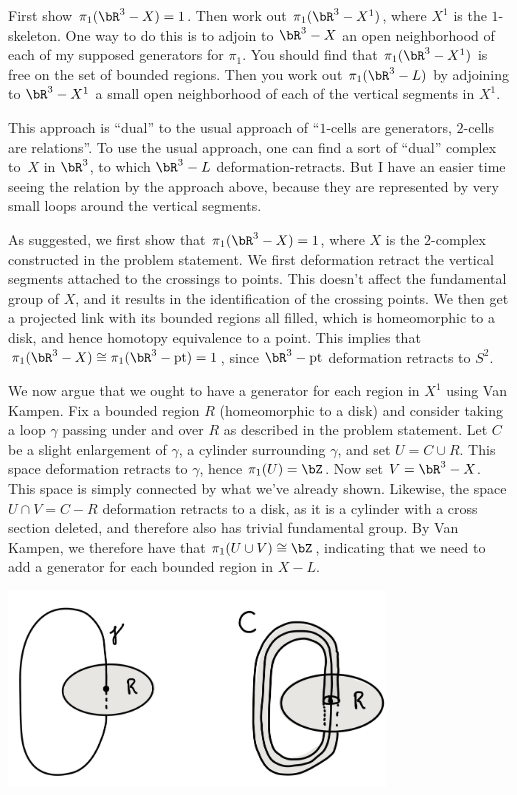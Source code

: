 \begin{homework}[e]
    First show  $\pi_1(\bR^3-X)=1$.  
    Then work out $\pi_1(\bR^3-X^1)$, where $X^1$ is
    the $1$-skeleton.  One way to do this is to  adjoin to $\bR^3-X$ an open
    neighborhood of each of my supposed  generators for $\pi_1$. 
    You should find that $\pi_1(\bR^3-X^1)$ is free on the set of bounded regions. 
    Then you work out $\pi_1(\bR^3-L)$ by adjoining to $\bR^3-X^1$ a small open
    neighborhood of each of the vertical segments in $X^1$. 
    
    This approach is ``dual'' to the usual approach of ``$1$-cells are generators,
    $2$-cells are relations''.  To use the usual approach, one can find a sort
    of ``dual'' complex to~$X$ in $\bR^3$, to which $\bR^3-L$ deformation-retracts.
    But 
    I have an easier time seeing the relation by the approach above, because they are
    represented by very small loops around the vertical segments.
\begin{prf}
  As suggested, we first show that $\pi_1(\bR^3 - X) = 1$, where $X$ is the $2$-complex constructed in the problem statement. We first deformation retract the vertical segments attached to the crossings to points. This doesn't affect the fundamental group of $X$, and it results in the identification of the crossing points. We then get a projected link with its bounded regions all filled, which is homeomorphic to a disk, and hence homotopy equivalence to a point. This implies that $\pi_1(\bR^3 - X) \cong \pi_1(\bR^3 - \text{pt}) = 1$, since $\bR^3 - \text{pt}$ deformation retracts to $S^2$.

  We now argue that we ought to have a generator for each region in $X^1$ using Van Kampen. Fix a bounded region $R$ (homeomorphic to a disk) and consider taking a loop $\gamma$ passing under and over $R$ as described in the problem statement. Let $C$ be a slight enlargement of $\gamma$, a cylinder surrounding $\gamma$, and set $U = C \cup R$. This space deformation retracts to $\gamma$, hence $\pi_1(U) = \bZ$. Now set $V = \bR^3 - X$. This space is simply connected by what we've already shown. Likewise, the space $U\cap V = C - R$ deformation retracts to a disk, as it is a cylinder with a cross section deleted, and therefore also has trivial fundamental group. By Van Kampen, we therefore have that $\pi_1(U \cup V) \cong \bZ$, indicating that we need to add a generator for each bounded region in $X - L$.
    \begin{center}
      \includegraphics[width=10cm]{figures/hwk4-fig9.png}
      \label{fig:prob1}
    \end{center}
  

\end{prf}
\end{homework}
